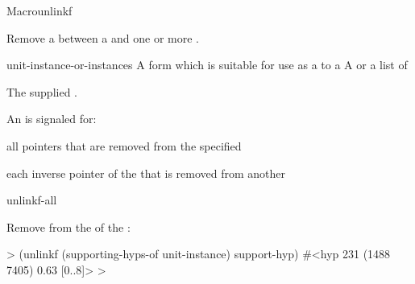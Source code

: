 \documentclass[10pt,twoside,english,pdftex]{article}
\begin{document}
\begin{functiondoc}{Macro}{unlinkf}%
  {
    \returns{} } 
%
%

\fnsyntax

\fnpurpose Remove a  between a  and one
or more .

\fnpackage {}

\fnmodule {}

\fnargs
\begin{args}{unit-instance-or-instances}
 A form which is suitable for use as a
 to a 
 A  or a
list of 
\end{args}

\fnreturns The supplied .

\fnevents
{}%
%
%
%
%
%
An  is signaled for:
\begin{tightitemize}
\item all pointers that are removed from the specified
\item each inverse pointer of the  that is removed from
  another 
\end{tightitemize}

\begin{alsos}{unlinkf-all}
\also[linkf]
\end{alsos}

\fnexample Remove  from the 
 of the  
:
%
\W\supp
\begin{example}
  > (unlinkf (supporting-hyps-of unit-instance) support-hyp)
  #<hyp 231 (1488 7405) 0.63 [0..8]>
  >
\end{example}

\end{functiondoc}

\end{document}
